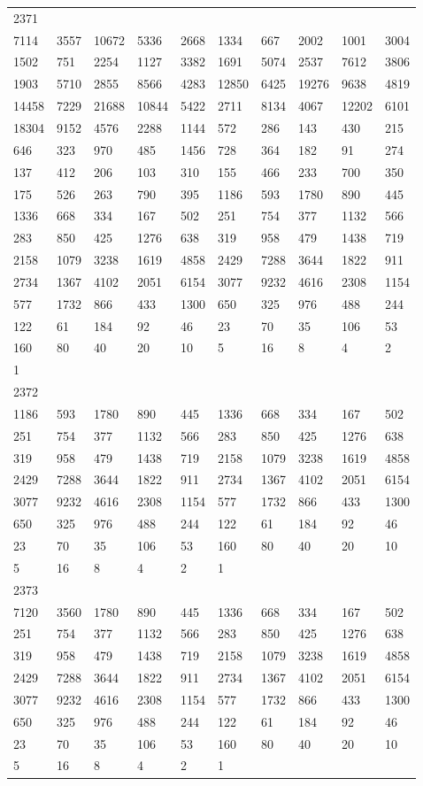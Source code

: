 \begin{longtable}{*{10}{l}}
2371&&&&&&&&&\\
7114& 3557& 10672& 5336& 2668& 1334& 667& 2002& 1001& 3004\\
1502& 751& 2254& 1127& 3382& 1691& 5074& 2537& 7612& 3806\\
1903& 5710& 2855& 8566& 4283& 12850& 6425& 19276& 9638& 4819\\
14458& 7229& 21688& 10844& 5422& 2711& 8134& 4067& 12202& 6101\\
18304& 9152& 4576& 2288& 1144& 572& 286& 143& 430& 215\\
646& 323& 970& 485& 1456& 728& 364& 182& 91& 274\\
137& 412& 206& 103& 310& 155& 466& 233& 700& 350\\
175& 526& 263& 790& 395& 1186& 593& 1780& 890& 445\\
1336& 668& 334& 167& 502& 251& 754& 377& 1132& 566\\
283& 850& 425& 1276& 638& 319& 958& 479& 1438& 719\\
2158& 1079& 3238& 1619& 4858& 2429& 7288& 3644& 1822& 911\\
2734& 1367& 4102& 2051& 6154& 3077& 9232& 4616& 2308& 1154\\
577& 1732& 866& 433& 1300& 650& 325& 976& 488& 244\\
122& 61& 184& 92& 46& 23& 70& 35& 106& 53\\
160& 80& 40& 20& 10& 5& 16& 8& 4& 2\\
1& \\

2372&&&&&&&&&\\
1186& 593& 1780& 890& 445& 1336& 668& 334& 167& 502\\
251& 754& 377& 1132& 566& 283& 850& 425& 1276& 638\\
319& 958& 479& 1438& 719& 2158& 1079& 3238& 1619& 4858\\
2429& 7288& 3644& 1822& 911& 2734& 1367& 4102& 2051& 6154\\
3077& 9232& 4616& 2308& 1154& 577& 1732& 866& 433& 1300\\
650& 325& 976& 488& 244& 122& 61& 184& 92& 46\\
23& 70& 35& 106& 53& 160& 80& 40& 20& 10\\
5& 16& 8& 4& 2& 1& \\

2373&&&&&&&&&\\
7120& 3560& 1780& 890& 445& 1336& 668& 334& 167& 502\\
251& 754& 377& 1132& 566& 283& 850& 425& 1276& 638\\
319& 958& 479& 1438& 719& 2158& 1079& 3238& 1619& 4858\\
2429& 7288& 3644& 1822& 911& 2734& 1367& 4102& 2051& 6154\\
3077& 9232& 4616& 2308& 1154& 577& 1732& 866& 433& 1300\\
650& 325& 976& 488& 244& 122& 61& 184& 92& 46\\
23& 70& 35& 106& 53& 160& 80& 40& 20& 10\\
5& 16& 8& 4& 2& 1& \\


\end{longtable}
